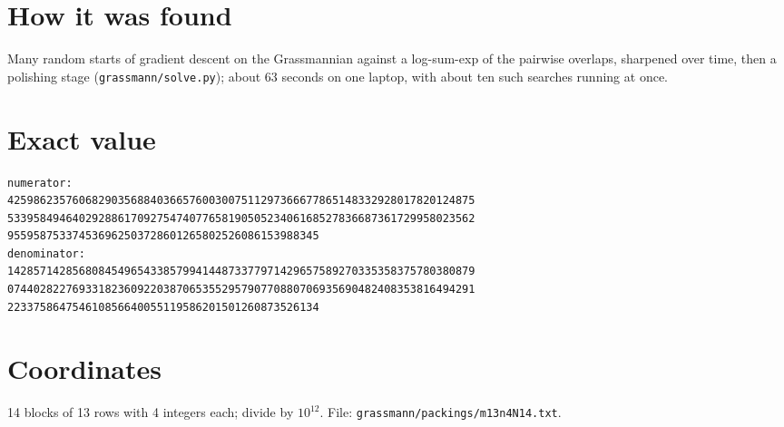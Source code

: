 \documentclass[11pt,a4paper]{article}
\begin{document}
\section{How it was found}
Many random starts of gradient descent on the Grassmannian against a log-sum-exp of the pairwise overlaps, sharpened over time, then a polishing stage (\texttt{grassmann/solve.py}); about 63 seconds on one laptop, with about ten such searches running at once.


\appendix
\section{Exact value}
{\small
\begin{verbatim}
numerator:
425986235760682903568840366576003007511297366677865148332928017820124875
533958494640292886170927547407765819050523406168527836687361729958023562
955958753374536962503728601265802526086153988345
denominator:
142857142856808454965433857994144873377971429657589270335358375780380879
074402822769331823609220387065355295790770880706935690482408353816494291
223375864754610856640055119586201501260873526134
\end{verbatim}}

\section{Coordinates}
14 blocks of 13 rows with 4 integers each; divide by $10^{12}$. File: \texttt{grassmann/packings/m13n4N14.txt}.
{\tiny
\begin{multicols}{3}
\end{multicols}}
\end{document}
